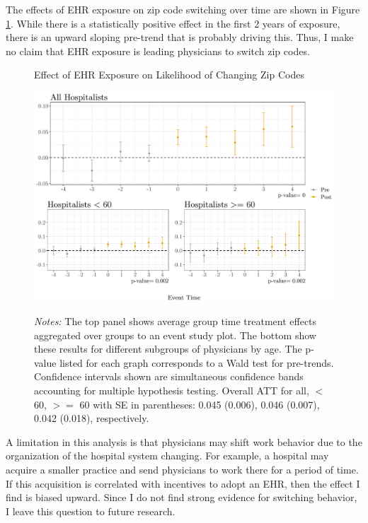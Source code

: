 \documentclass[11pt]{article}
\begin{document}
The effects of EHR exposure on zip code switching over time are shown in Figure \ref{fig:zip}. While there is a statistically positive effect in the first 2 years of exposure, there is an upward sloping pre-trend that is probably driving this. Thus, I make no claim that EHR exposure is leading physicians to switch zip codes.

\begin{figure}[ht]
    \centering
    \caption{Effect of EHR Exposure on Likelihood of Changing Zip Codes}
    \includegraphics[scale=.65]{Objects/zip_plot.pdf}
    \label{fig:zip}
    \vspace{2mm}
    \caption*{\footnotesize{\textit{Notes:} The top panel shows average group time treatment effects aggregated over groups to an event study plot. The bottom show these results for different subgroups of physicians by age. The p-value listed for each graph corresponds to a Wald test for pre-trends. Confidence intervals shown are simultaneous confidence bands accounting for multiple hypothesis testing. Overall ATT for all, $<$ 60, $>=$ 60 with SE in parentheses: 0.045 (0.006), 0.046 (0.007), 0.042 (0.018), respectively.}}
\end{figure}

A limitation in this analysis is that physicians may shift work behavior due to the organization of the hospital system changing. For example, a hospital may acquire a smaller practice and send physicians to work there for a period of time. If this acquisition is correlated with incentives to adopt an EHR, then the effect I find is biased upward. Since I do not find strong evidence for switching behavior, I leave this question to future research.
\end{document}
